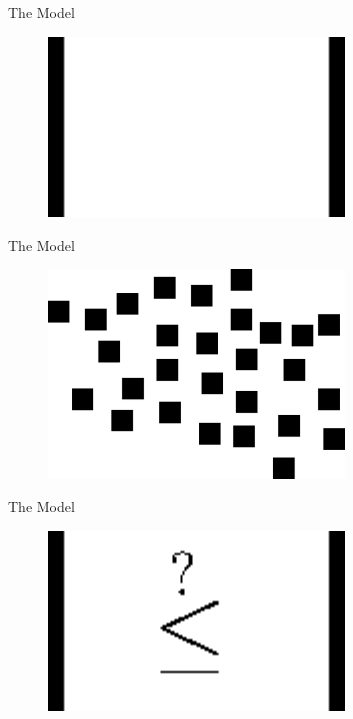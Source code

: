 \documentclass{beamer}
\begin{document}
\begin{frame}[c]{The Model}
\begin{figure}[hbtp]
\centering
\includegraphics[width=0.7\textwidth]{fig/number/close}
\end{figure}
\end{frame}

\begin{frame}[c]{The Model}
\begin{figure}[hbtp]
\centering
\includegraphics[width=0.7\textwidth]{fig/box/cloud}
\end{figure}
\end{frame}

\begin{frame}[c]{The Model}
\begin{figure}[hbtp]
\centering
\includegraphics[width=0.7\textwidth]{fig/box/comp}
\end{figure}
\end{frame}
\end{document}
